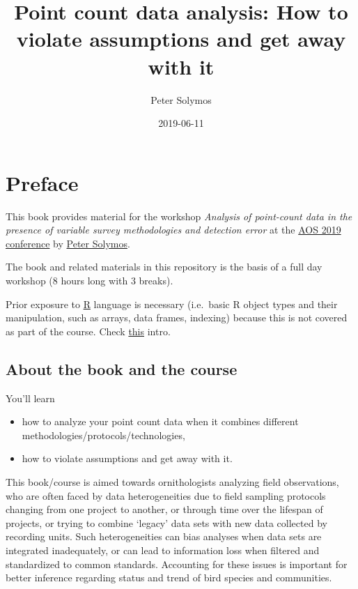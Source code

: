 \documentclass[12pt,]{book}
\title{Point count data analysis: How to violate assumptions and get away with it}
\author{Peter Solymos}
\date{2019-06-11}
\providecommand{\tightlist}{%
  \setlength{\itemsep}{0pt}\setlength{\parskip}{0pt}}
\begin{document}
\maketitle

{
\hypersetup{linkcolor=black}
\setcounter{tocdepth}{2}
\tableofcontents
}
\hypertarget{foreword}{%
\chapter*{Preface}\label{foreword}}

This book provides material for the workshop
\emph{Analysis of point-count data in the presence of variable survey methodologies and detection error}
at the \href{https://amornithmeeting.org/}{AOS 2019 conference}
by \href{http://peter.solymos.org}{Peter Solymos}.

The book and related materials in this repository is the basis of a
full day workshop (8 hours long with 3 breaks).

Prior exposure to \href{https://www.r-project.org/}{R} language is necessary
(i.e.~basic R object types and their manipulation, such as arrays, data frames, indexing)
because this is not covered as part of the course.
Check \href{_etc/R-basics.pdf}{this} intro.

\hypertarget{about-the-book-and-the-course}{%
\section*{About the book and the course}\label{about-the-book-and-the-course}}

You'll learn

\begin{itemize}
\tightlist
\item
  how to analyze your point count data when it combines different methodologies/protocols/technologies,
\item
  how to violate assumptions and get away with it.
\end{itemize}

This book/course is aimed towards ornithologists analyzing field observations,
who are often faced by data heterogeneities due to
field sampling protocols changing from one project to another,
or through time over the lifespan of projects, or trying to combine
`legacy' data sets with new data collected by recording units.
Such heterogeneities can bias analyses when data sets are integrated
inadequately, or can lead to information loss when filtered and standardized to
common standards. Accounting for these issues is important for better
inference regarding status and trend of bird species and communities.
\end{document}

